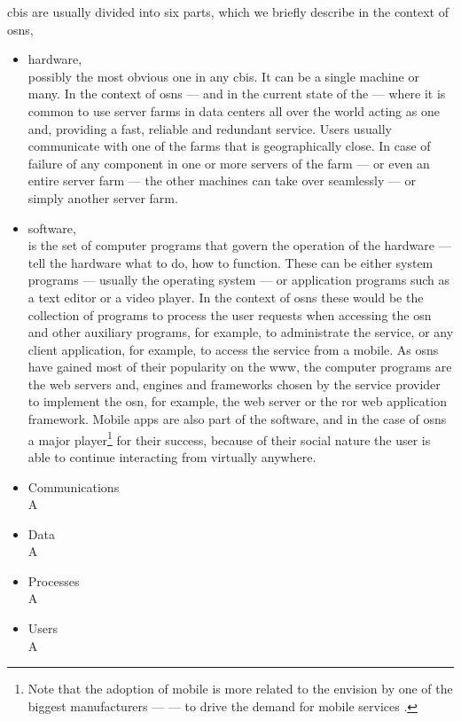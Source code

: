 \documentclass[showtrims,oldfontcommands]{kthesis}
\begin{document}
\Ac{cbis} are usually divided into six parts, which we briefly describe in the context 
of \acp{osn},
\begin{itemize}
    \item hardware,\\
    possibly the most obvious one in any \ac{cbis}. It can be a single machine or 
    many. In the context of \acp{osn} --- and in the current state of the \Internet 
    --- where it is common to use server farms in data centers all over the world 
    acting as one and, providing a fast, reliable and redundant service. Users usually 
    communicate with one of the farms that is geographically close. In case of failure 
    of any component in one or more servers of the farm --- or even an entire server 
    farm --- the other machines can take over seamlessly --- or simply another server 
    farm.
    
    \item software,\\
    is the set of computer programs that govern the operation of the hardware --- 
    tell the hardware what to do, how to function. These can be either system programs 
    --- usually the operating system --- or application programs such as a text 
    editor or a video player. In the context of \acp{osn} these would be the collection 
    of programs to process the user requests when accessing the \ac{osn} and other 
    auxiliary programs, for example, to administrate the service, or any client 
    application, for example, to access the service from a mobile. As \acp{osn} 
    have gained most of their popularity on the \ac{www}, the computer programs 
    are the web servers and, engines and frameworks chosen by the service provider 
    to implement the \ac{osn}, for example, the \Apache web server or the \ac{ror} 
    web application framework. Mobile apps are also part of the software, and in 
    the case of \acp{osn} a major player\footnote{Note that the adoption of mobile 
    \Internet is more related to the envision by one of the biggest manufacturers 
    --- \Apple --- to drive the demand for mobile services \cite{WestM10}.} for their 
    success, because of their social nature the user is able to continue interacting 
    from virtually anywhere.
    
    \item Communications\\
    A
    
    \item Data\\
    A
    
    \item Processes\\
    A
    
    \item Users\\
    A
    
\end{itemize}
\end{document}
